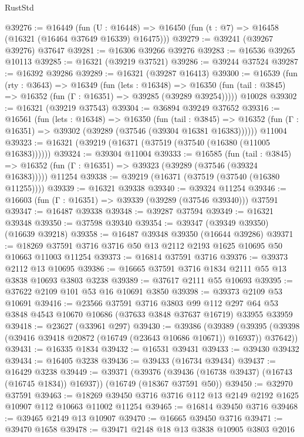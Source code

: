 \begin{lexlean}{RustStd}
\begin{coremodule}
@39276 := @16449
    (fun (U : @16448) => @16450 (fun (t : @7) => @16458 (@16321 (@16464 @37649 @16339) @16475)))
@39279 := @39241 (@39267 @39276) @37647
@39281 := @16306 @39266 @39276
@39283 := @16536 @39265 @10113
@39285 := @16321 (@39219 @37521)
@39286 := @39244 @37524
@39287 := @16392 @39286
@39289 := @16321 (@39287 @16413)
@39300 := @16539
    (fun (rty : @3643) =>
    @16349
      (fun (lets : @16348) =>
      @16350 (fun (tail : @3845) => @16352 (fun (Γ : @16351) => @39285 (@39289 @39254)))))
    @10028
@39302 := @16321 (@39219 @37543)
@39304 := @36894 @39249 @37652
@39316 := @16561
    (fun (lets : @16348) =>
    @16350
      (fun (tail : @3845) =>
      @16352 (fun (Γ : @16351) => @39302 (@39289 (@37546 (@39304 @16381 @16383))))))
    @11004
@39323 := @16321 (@39219 (@16371 (@37519 (@37540 (@16380 (@11005 @16383))))))
@39324 := @39304 @11004
@39333 := @16585
    (fun (tail : @3845) => @16352 (fun (Γ : @16351) => @39323 (@39289 (@37546 (@39324 @16383)))))
    @11254
@39338 := @39219 (@16371 (@37519 (@37540 (@16380 @11255))))
@39339 := @16321 @39338
@39340 := @39324 @11254
@39346 := @16603 (fun (Γ : @16351) => @39339 (@39289 (@37546 @39340))) @37591
@39347 := @16487 @39338
@39348 := @39287 @37594
@39349 := @16321 @39348
@39350 := @37598 @39340
@39354 := @39347 (@39349 @39350) (@16639 @39218)
@39358 := @16487 @39348 @39350 (@16644 @39286)
@39371 := @18269 @37591 @3716 @3716 @50 @13 @2112 @2193 @1625 @10695 @50 @10663 @11003 @11254
@39373 := @16814 @37591 @3716
@39376 := @39373 @2112 @13 @10695
@39386 := @16665 @37591 @3716 @1834 @2111 @55 @13 @3838 @10693 @3803 @3238
@39389 := @37617 @2111 @55 @10693
@39395 := @37622 @2109 @101 @53 @16 @10691 @3850
@39398 := @39373 @2109 @53 @10691
@39416 := @23566
    @37591
    @3716
    @3803
    @99
    @112
    @297
    @64
    @53
    @3848
    @4543
    @10670
    @10686
    (@37633 @3848 @37637 @16719)
    @33955
    @33959
@39418 := @23627 (@33961 @297)
@39430 := @39386
    (@39389 (@39395 (@39398 (@39416 @39418 @20872 (@16749 (@23643 @10686 @10671)) @16937)) @37642))
@39431 := @16335 @1834
@39432 := @16531 @39431
@39433 := @39430 @39432
@39434 := @16405 @3238
@39436 := @39433 (@16734 @39434)
@39437 := @16429 @3238
@39449 := @39371
    (@39376 (@39436 (@16738 @39437) (@16743 (@16745 @1834)) @16937))
    (@16749 (@18367 @37591 @50))
@39450 := @32970 @37591
@39463 := @18269 @39450 @3716 @3716 @112 @13 @2149 @2192 @1625 @10907 @112 @10663 @11002 @11254
@39465 := @16814 @39450 @3716
@39468 := @39465 @2149 @13 @10907
@39470 := @16665 @39450 @3716
@39471 := @39470 @1658
@39478 := @39471 @2148 @18 @13 @3838 @10905 @3803 @2016

\end{coremodule}
\end{lexlean}
